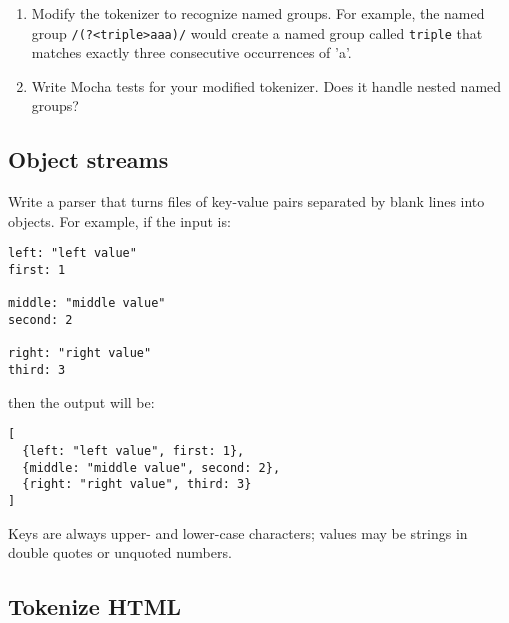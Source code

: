 \documentclass[krantzl]{krantz}
\begin{document}
\begin{enumerate}

\item 

Modify the tokenizer to recognize named groups.
    For example, the named group \texttt{/(?<triple>aaa)/}
    would create a named group called \texttt{triple} that matches exactly three consecutive occurrences of 'a'.



\item 

Write Mocha tests for your modified tokenizer.
    Does it handle nested named groups?



\end{enumerate}

\subsection*{Object streams}


Write a parser that turns files of key-value pairs separated by blank lines into objects.
For example, if the input is:

\begin{lstlisting}[frame=single,frameround=tttt]
left: "left value"
first: 1

middle: "middle value"
second: 2

right: "right value"
third: 3
\end{lstlisting}


\noindent then the output will be:

\begin{lstlisting}[frame=single,frameround=tttt]
[
  {left: "left value", first: 1},
  {middle: "middle value", second: 2},
  {right: "right value", third: 3}
]
\end{lstlisting}


Keys are always upper- and lower-case characters;
values may be strings in double quotes or unquoted numbers.

\subsection*{Tokenize HTML}
\end{document}
